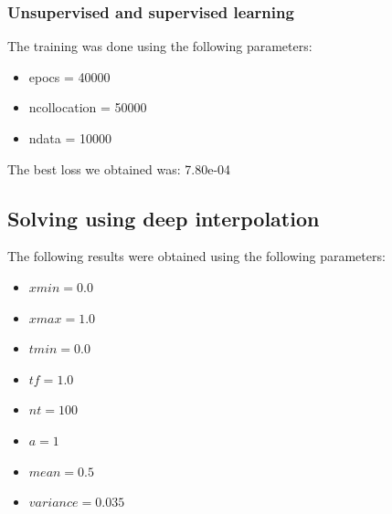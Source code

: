 \documentclass{article}
\begin{document}
\subsubsection{Unsupervised and supervised learning}

The training was done using the following parameters:

\begin{itemize}
   \item epocs = 40000
   \item ncollocation = 50000
   \item ndata = 10000
\end{itemize}

The best loss we obtained was: 7.80e-04 

\subsection{Solving using deep interpolation}
The following results were obtained using the following parameters:

\begin{itemize}
    \item $xmin = 0.0$
    \item $xmax = 1.0$
    \item $tmin = 0.0$
    \item $tf = 1.0$
    \item $nt = 100$
    \item $a = 1$
    \item $mean = 0.5$
    \item $variance = 0.035$
\end{itemize}
\end{document}
